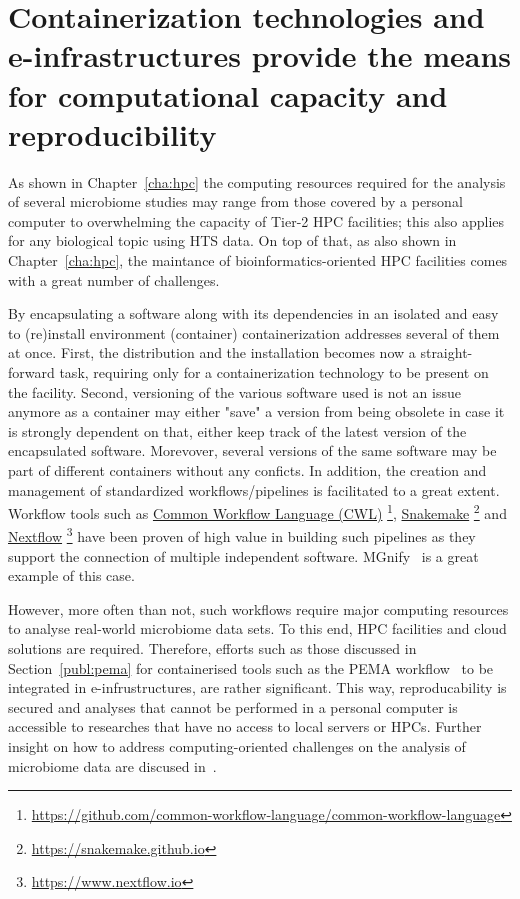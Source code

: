 \section{Containerization technologies and e-infrastructures provide the means for computational capacity and reproducibility} 
\label{concl:comput}
   
      As shown in Chapter~\ref{cha:hpc} the computing resources required for the analysis of several 
      microbiome studies may range from those covered by a personal computer to overwhelming the capacity
      of Tier-2 HPC facilities;
      this also applies for any biological topic using HTS data. 
      On top of that, as also shown in Chapter~\ref{cha:hpc}, the maintance of bioinformatics-oriented HPC facilities 
      comes with a great number of challenges. 
   
      By encapsulating a software along with its dependencies in an isolated and easy to (re)install environment (container) 
      containerization addresses several of them at once.
      First, the distribution and the installation becomes now a straight-forward task, requiring only for a containerization technology 
      to be present on the facility.
      Second, versioning of the various software used is not an issue anymore as a container may either "save" a version from being obsolete
      in case it is strongly dependent on that, either keep track of the latest version of the encapsulated software. 
      Morevover, several versions of the same software may be part of different containers without any conficts.
      In addition, the creation and management of standardized workflows/pipelines is facilitated to a great extent. 
      Workflow tools such as 
      \href{https://github.com/common-workflow-language/common-workflow-language}{Common Workflow Language (CWL)}
      \footnote{\href{https://github.com/common-workflow-language/common-workflow-language}{https://github.com/common-workflow-language/common-workflow-language}}, 
      \href{https://snakemake.github.io}{Snakemake} 
      \footnote{\href{https://snakemake.github.io}{https://snakemake.github.io}}
      and 
      \href{https://www.nextflow.io}{Nextflow}
      \footnote{\href{https://www.nextflow.io}{https://www.nextflow.io}}
      have been proven of high value 
      in building such pipelines as they support the connection of multiple independent software.
      MGnify~\citep{mitchell2020mgnify} is a great example of this case. 
   
      However, more often than not, such workflows require major computing resources to analyse
      real-world microbiome data sets.
      To this end, HPC facilities and cloud solutions are required. 
      Therefore, efforts such as those discussed in Section~\ref{publ:pema} 
      for containerised tools such as the PEMA workflow~\citep{zafeiropoulos2020pema}
      to be integrated in e-infrustructures, are rather significant. 
      This way, reproducability is secured and analyses that cannot be performed in a personal computer
      is accessible to researches that have no access to local servers or HPCs. 
      Further insight on how to address computing-oriented challenges on the analysis of microbiome data
      are discused in~\citep{hu2022challenges}.  


